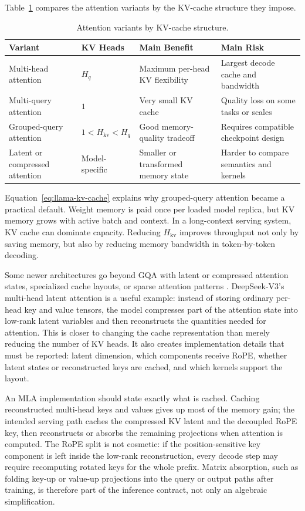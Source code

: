 Table~\ref{tab:attention-variants-kv} compares the attention variants by the KV-cache structure they impose.

\begin{table}[t]
\caption{Attention variants by KV-cache structure.}
\label{tab:attention-variants-kv}
\small
\begin{tabular}{@{}p{2.8cm}p{2.2cm}p{3.5cm}p{3.1cm}@{}}
\toprule
Variant & KV Heads & Main Benefit & Main Risk \\
\midrule
Multi-head attention & $H_q$ & Maximum per-head KV flexibility & Largest decode cache and bandwidth \\
Multi-query attention & $1$ & Very small KV cache & Quality loss on some tasks or scales \\
Grouped-query attention & $1 < H_{\mathrm{kv}} < H_q$ & Good memory-quality tradeoff & Requires compatible checkpoint design \\
Latent or compressed attention & Model-specific & Smaller or transformed memory state & Harder to compare semantics and kernels \\
\bottomrule
\end{tabular}
\end{table}

Equation~\ref{eq:llama-kv-cache} explains why grouped-query attention became a practical default. Weight memory is paid once per loaded model replica, but KV memory grows with active batch and context. In a long-context serving system, KV cache can dominate capacity. Reducing $H_{\mathrm{kv}}$ improves throughput not only by saving memory, but also by reducing memory bandwidth in token-by-token decoding.

Some newer architectures go beyond GQA with latent or compressed attention states, specialized cache layouts, or sparse attention patterns \cite{deepseek2024v3}. DeepSeek-V3's multi-head latent attention is a useful example: instead of storing ordinary per-head key and value tensors, the model compresses part of the attention state into low-rank latent variables and then reconstructs the quantities needed for attention. This is closer to changing the cache representation than merely reducing the number of KV heads. It also creates implementation details that must be reported: latent dimension, which components receive RoPE, whether latent states or reconstructed keys are cached, and which kernels support the layout.

An MLA implementation should state exactly what is cached. Caching reconstructed multi-head keys and values gives up most of the memory gain; the intended serving path caches the compressed KV latent and the decoupled RoPE key, then reconstructs or absorbs the remaining projections when attention is computed. The RoPE split is not cosmetic: if the position-sensitive key component is left inside the low-rank reconstruction, every decode step may require recomputing rotated keys for the whole prefix. Matrix absorption, such as folding key-up or value-up projections into the query or output paths after training, is therefore part of the inference contract, not only an algebraic simplification.

